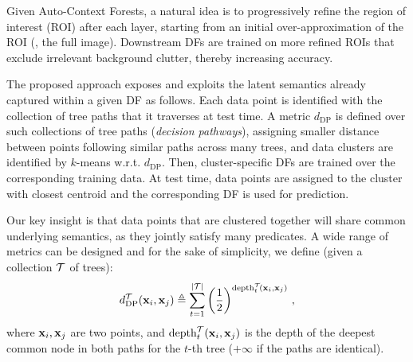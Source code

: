 Given Auto-Context Forests, a natural idea is to progressively refine the region of interest (ROI) after each layer, starting from an initial over-approximation of the ROI (\eg, the full image). Downstream DFs are trained on 
more refined ROIs that exclude irrelevant background clutter, thereby increasing accuracy.

The proposed approach exposes and exploits the latent semantics already captured within a given DF as follows. Each data point is identified with the collection of tree paths that it traverses at test time. A metric $d_{\text{DP}}$ is defined over such collections of tree paths (\textit{decision pathways}), assigning smaller distance between points following similar paths across many trees, and data clusters are identified by $k$-means w.r.t. $d_{\text{DP}}$. %
Then, cluster-specific DFs are trained over the corresponding training data. At test time, data points are assigned to the cluster with closest centroid and the corresponding DF is used for prediction.

Our key insight is that data points that are clustered together will share common underlying semantics, as they jointly satisfy many predicates. A wide range of metrics can be designed and for the sake of simplicity, we define (given a collection $\mathcal{T}$ of trees):
\begin{equation}
d_{\text{DP}}^{\mathcal{T}}(\boldsymbol{\mathrm{x}}_i, \boldsymbol{\mathrm{x}}_j)\triangleq \sum_{t=1}^{\vert\mathcal{T}\vert} \left(\frac{1}{2}\right)^{\text{depth}_t^{\mathcal{T}}\!(\boldsymbol{\mathrm{x}}_i,\boldsymbol{\mathrm{x}}_j)}\, ,
\end{equation}
where $\boldsymbol{\mathrm{x}}_i, \boldsymbol{\mathrm{x}}_j$ are two points, and $\text{depth}_t^{\mathcal{T}}(\boldsymbol{\mathrm{x}}_i,\boldsymbol{\mathrm{x}}_j)$ is the depth of the deepest common node in both paths for the $t$-th tree ($+\infty$ if the paths are identical).

